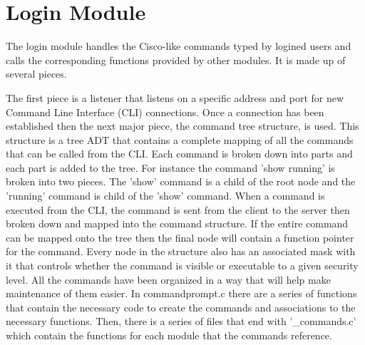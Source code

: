 \section{Login Module}
\label{sec:login}

The login module handles the Cisco-like commands typed by logined users and calls the corresponding functions provided by other modules. It is made up of several pieces.  

The first piece is a listener that listens on a specific address and port for new Command Line Interface (CLI) connections.  Once a connection has been established then the next major piece, the command tree structure, is used.  This structure is a tree ADT that contains a complete mapping of all the commands that can be called from the CLI.  Each command is broken down into parts and each part is added to the tree.  For instance the command 'show running' is broken into two pieces.  The 'show' command is a child of the root node and the 'running' command is child of the 'show' command.  When a command is executed from the CLI, the command is sent from the client to the server then broken down and mapped into the command structure.  If the entire command can be mapped onto the tree then the final node will contain a function pointer for the command.  Every node in the structure also has an associated mask with it that controls whether the command is visible or executable to a given security level.  All the commands have been organized in a way that will help make maintenance of them easier.  In commandprompt.c there are a series of functions that contain the necessary code to create the commands and associations to the necessary functions.  Then, there is a series of files that end with '\_commands.c' which contain the functions for each module that the commands reference.